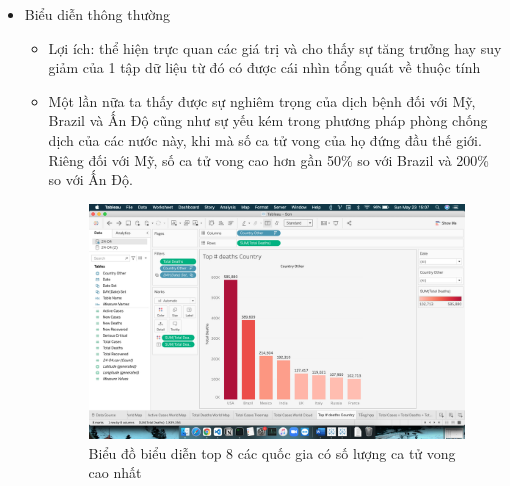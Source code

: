 \documentclass[a4paper, 12pt]{article}
\begin{document}
\begin{itemize}
    \item Biểu diễn thông thường
    \begin{itemize}
        \item Lợi ích: thể hiện trực quan các giá trị và cho thấy sự tăng trưởng hay suy giảm của 1 tập dữ liệu từ đó có được cái nhìn tổng quát về thuộc tính
        \item Một lần nữa ta thấy được sự nghiêm trọng của dịch bệnh đối với Mỹ, Brazil và Ấn Độ cũng như sự yếu kém trong phương pháp phòng chống dịch của các nước này, khi mà số ca tử vong của họ đứng đầu thế giới. Riêng đối với Mỹ, số ca tử vong cao hơn gần 50\% so với Brazil và 200\% so với Ấn Độ.
        \begin{figure}[H]
            \begin{center}
                \includegraphics[scale=0.4]{img/barChartTotalDeaths.png}
                \caption{Biểu đồ biểu diễn top 8 các quốc gia có số lượng ca tử vong cao nhất}
            \end{center}
        \end{figure}
    \end{itemize}


\end{itemize}
\end{document}
